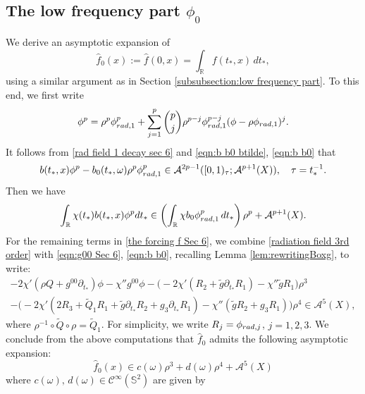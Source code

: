 \documentclass[10pt,a4paper,reqno]{amsart}
\newcommand{\CI}{\mathcal{C}^\infty}
\newcommand{\RR}{\mathbb{R}}
\newcommand{\A}{\mathcal{A}}
\newcommand{\pa}{\partial}
\renewcommand{\S}{{\mathbb S}}
\let\hat\widehat
\theoremstyle{definition}
\theoremstyle{remark}
\numberwithin{equation}{section}
\newcommand{\ts}{t_*}
\newcommand{\wh}{\widehat}
\newcommand{\pats}{\pa_{t_*}}
\begin{document}
\subsection{The low frequency part $\phi_0$}
\label{subsection: low frequency Sec 6}
We derive an asymptotic expansion of
\begin{equation}
\label{eqn:fhat(0) defn Sec 6}
    \hat{f}_0(x) := \hat{f}(0,x) = \int_{\mathbb R} f(t_*,x)\,dt_*,
\end{equation}
using a similar argument as in Section \ref{subsubsection:low frequency part}. To this end, we first write
\begin{equation}
\label{phi p power expansion}
	\phi^p = \rho^p \phi_{{\rm rad},1}^p + \sum_{j=1}^{p}\binom{p}{j} \rho^{p-j}\phi_{{\rm rad},1}^{p-j} (\phi-\rho\phi_{{\rm rad},1})^j.
\end{equation}
It follows from \eqref{rad field 1 decay sec 6} and \eqref{eqn:b b0 btilde}, \eqref{eqn:b b0} that
\begin{equation}
\label{p nonlinearity expansion}
	b(\ts,x)\phi^p - b_0(\ts,\omega)\rho^p \phi_{{\rm rad},1}^p \in \A^{2p-1}([0,1)_\tau ; \A^{p+1}(X)),\quad \tau=\ts^{-1} .
\end{equation}
Then we have
\begin{equation}
\label{chi b phi^p}
    \int_{\RR} \chi(\ts)b(\ts,x)\phi^p d\ts \in \left( 
    \int_{\RR} \chi b_0\phi_{{\rm rad},1}^p\,d\ts\right)\rho^p + \A^{p+1}(X) .
\end{equation}
For the remaining terms in \eqref{the forcing f Sec 6}, we combine \eqref{radiation field 3rd order} with \eqref{eqn:g00 Sec 6}, \eqref{eqn:b b0}, recalling Lemma \ref{lem:rewritingBoxg}, to write:
\[
\begin{gathered}
    - 2\chi'(\rho Q + g^{00}\pats)\phi - \chi'' g^{00} \phi - \bigl(-2\chi'(R_2+\tilde{g}\pa_{\ts}R_1) - \chi''\tilde{g} R_1\bigr)\rho^3 \\
    - \bigl(-2\chi'(2R_3+\widetilde{Q}_1 R_1 + \tilde{g}\pa_{\ts}R_2 + g_3 \pa_{\ts}R_1) - \chi''(\tilde{g}R_2+ g_3 R_1)\bigr)\rho^4 \in \A^5(X),
\end{gathered}
\]
where $\rho^{-1}\circ\widetilde{Q}\circ\rho = \widetilde{Q}_1$. For simplicity, we write $R_j = \phi_{{\rm rad},j}$, $j=1,2,3$. We conclude from the above computations that $\wh{f}_0$ admits the following asymptotic expansion:
\begin{equation}
\label{fhat(0) asymp Sec 6}
    \wh{f}_0(x) \in c(\omega)\rho^3 + d(\omega)\rho^4 + \A^5(X)
\end{equation}
where $c(\omega),\,d(\omega)\in\CI(\S^2)$ are given by
\end{document}
